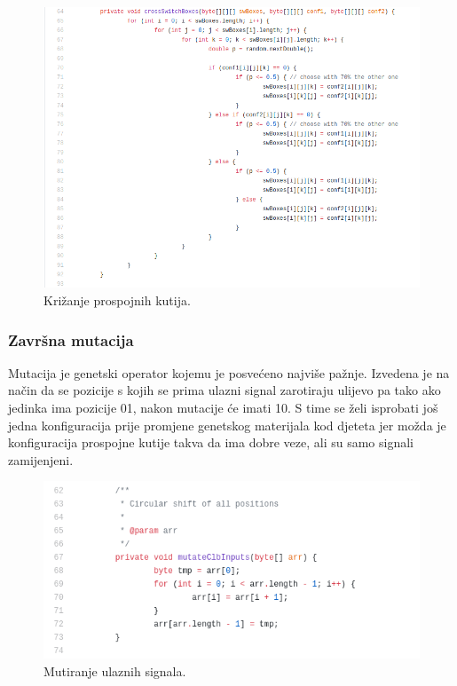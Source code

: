 \documentclass[times, utf8, zavrsni]{fer}
\begin{document}
	\begin{figure}[H]
		\centering
		\includegraphics[width=18cm]{slike/crossSwBoxes.png}
		\caption{Križanje prospojnih kutija.}
		\label{fig:sw-boxes-crossing}
	\end{figure} 
	
	\subsubsection{Završna mutacija}
	\label{EndMutation}
	
	Mutacija je genetski operator kojemu je posvećeno najviše pažnje. Izvedena je na način da se pozicije s kojih se prima ulazni signal zarotiraju ulijevo pa tako ako jedinka ima pozicije 01, nakon mutacije će imati 10. S time se želi isprobati još jedna konfiguracija prije promjene genetskog materijala kod djeteta jer možda je konfiguracija prospojne kutije takva da ima dobre veze, ali su samo signali zamijenjeni.  
	
	\begin{figure}[H]
		\centering
		\includegraphics[width=18cm]{slike/circularShift.png}
		\caption{Mutiranje ulaznih signala.}
		\label{fig:sw-boxes-inputs-mutation}
	\end{figure} 
	
\end{document}
